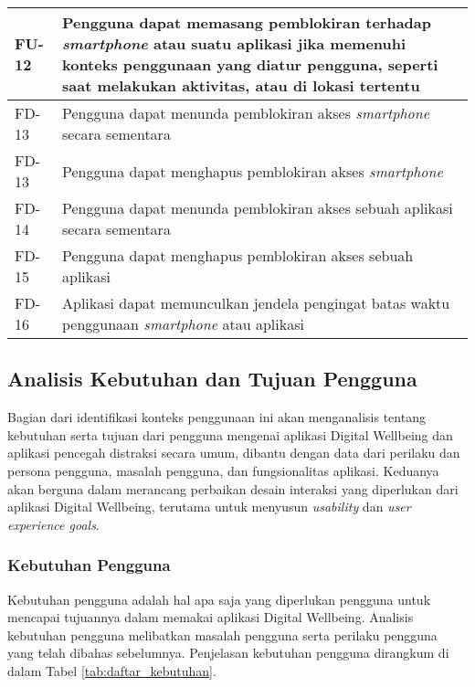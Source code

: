 \begin{small}
\begin{longtable}[c]{|W{c}{0.08\textwidth}|>{\ccnormspacing}m{0.82\textwidth}|}
  FU-12  &  Pengguna dapat memasang pemblokiran terhadap \textit{smartphone} atau suatu aplikasi jika memenuhi konteks penggunaan yang diatur pengguna, seperti saat melakukan aktivitas, atau di lokasi tertentu \\ \hline
  FD-13  &  Pengguna dapat menunda pemblokiran akses \textit{smartphone} secara sementara \\ \hline
  FD-13  &  Pengguna dapat menghapus pemblokiran akses \textit{smartphone}\\ \hline
  FD-14  &  Pengguna dapat menunda pemblokiran akses sebuah aplikasi secara sementara \\ \hline
  FD-15  &  Pengguna dapat menghapus pemblokiran akses sebuah aplikasi \\ \hline
  FD-16  &  Aplikasi dapat memunculkan jendela pengingat batas waktu penggunaan \textit{smartphone} atau aplikasi \\ \hline
  
  
\end{longtable}
\end{small}
\justifying
\FloatBarrier

\subsection{Analisis Kebutuhan dan Tujuan Pengguna}
\label{subsec:analisis_kebutuhan_tujuan}

Bagian dari identifikasi konteks penggunaan ini akan menganalisis tentang kebutuhan serta tujuan dari pengguna mengenai aplikasi Digital Wellbeing dan aplikasi pencegah distraksi secara umum, dibantu dengan data dari perilaku dan persona pengguna, masalah pengguna, dan fungsionalitas aplikasi. Keduanya akan berguna dalam merancang perbaikan desain interaksi yang diperlukan dari aplikasi Digital Wellbeing, terutama untuk menyusun \textit{usability} dan \textit{user experience goals}.

\subsubsection{Kebutuhan Pengguna}
\label{subsubsec:kebutuhan_pengguna}

Kebutuhan pengguna adalah hal apa saja yang diperlukan pengguna untuk mencapai tujuannya dalam memakai aplikasi Digital Wellbeing. Analisis kebutuhan pengguna melibatkan masalah pengguna serta perilaku pengguna yang telah dibahas sebelumnya. Penjelasan kebutuhan pengguna dirangkum di dalam Tabel \ref{tab:daftar_kebutuhan}.

